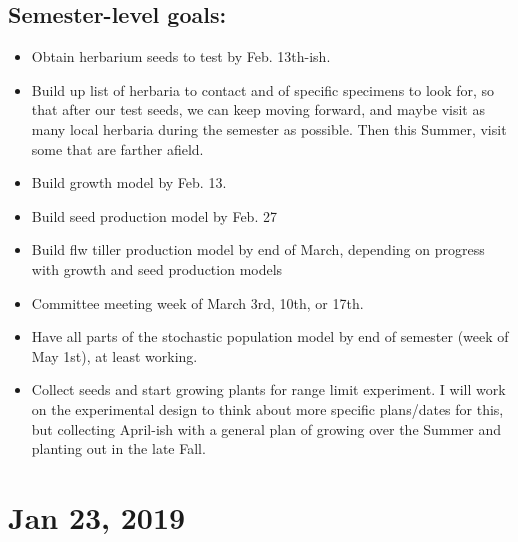 \documentclass{article}
\newcommand{\tom}[1]{{\textit{\color{WildStrawberry}{[#1]}}}}
\begin{document}
\subsection*{Semester-level goals:}
\begin{itemize}
\item{Obtain herbarium seeds to test by Feb. 13th-ish.\tom{This is not really a semester-level goal}}
\item{Build up list of herbaria to contact and of specific specimens to look for, so that after our test seeds, we can keep moving forward, and maybe visit as many local herbaria during the semester as possible. Then this Summer, visit some that are farther afield.\tom{I think that the questions motivating the herbarium work are not yet fully formed, and this should precede any herbarium trips.}}
\item{Build growth model by Feb. 13.}
\item{Build seed production model by Feb. 27 \tom{I am not really sure what this means.}}
\item{Build flw tiller production model by end of March, depending on progress with growth and seed production models}
\item{Committee meeting week of March 3rd, 10th, or 17th.}
\item{Have all parts of the stochastic population model by end of semester (week of May 1st), at least working. \tom{My suggestion is that they should be final by then.}}
\item{Collect seeds and start growing plants for range limit experiment. I will work on the experimental design to think about more specific plans/dates for this, but collecting April-ish with a general plan of growing over the Summer and planting out in the late Fall.}
\end{itemize}



\section*{Jan 23, 2019}
\end{document}
